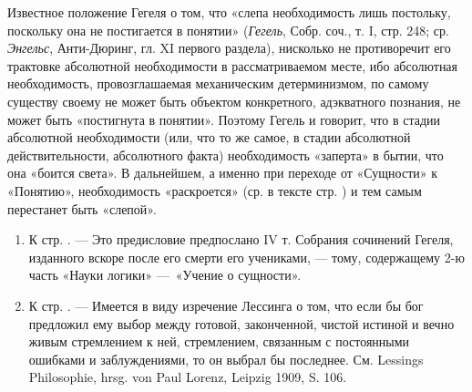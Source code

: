 Известное положение Гегеля о том, что «слепа необходимость лишь постольку,
поскольку она не постигается в понятии» ({\em Гегель}, Собр. соч., т. I,
стр. 248; ср. {\em Энгельс}, Анти-Дюринг, гл. XI первого раздела),
нисколько не противоречит его трактовке абсолютной необходимости в
рассматриваемом месте, ибо абсолютная необходимость, провозглашаемая
механическим детерминизмом, по самому существу своему не может быть
объектом конкретного, адэкватного познания, не может быть «постигнута в
понятии». Поэтому Гегель и говорит, что в стадии абсолютной необходимости
(или, что то же самое, в стадии абсолютной действительности, абсолютного
факта) необходимость «заперта» в бытии, что она «боится света». В
дальнейшем, а именно при переходе от «Сущности» к «Понятию», необходимость
«раскроется» (ср. в тексте стр. \pageref{bkm:bm93a}) и тем самым перестанет
быть «слепой».

\begin{enumerate}
\item \label{bkm:Ref474669698}К стр. \pageref{bkm:bm94}. — Это предисловие
предпослано IV т. Собрания сочинений Гегеля, изданного вскоре после его
смерти его учениками, — тому, содержащему 2-ю часть «Науки логики»
—~«Учение о сущности».
\item \label{bkm:Ref474655210}К стр. \pageref{bkm:bm95}. — Имеется в виду
изречение Лессинга о том, что если бы бог предложил ему выбор между
готовой, законченной, чистой истиной и вечно живым стремлением к ней,
стремлением, связанным с постоянными ошибками и заблуждениями, то он выбрал
бы последнее. См. Lessings Philosophie, hrsg. von Paul Lorenz, Leipzig
1909, S. 106.
\end{enumerate}

\bigskip


\bigskip
